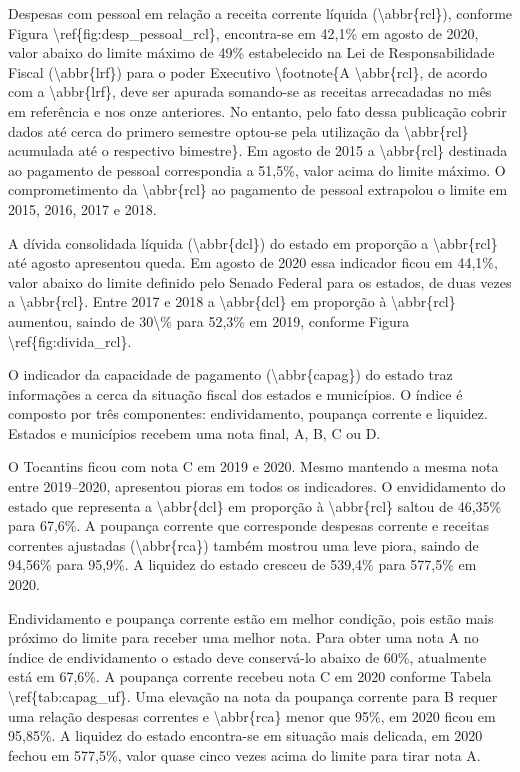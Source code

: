 \documentclass[twocolumn, a4paper, 10pt]{report}
\begin{document}
    Despesas com pessoal em relação a receita corrente líquida
    (\textbackslash abbr\{rcl\}), conforme Figura
    \textbackslash ref\{fig:desp\_pessoal\_rcl\}, encontra-se em 42,1\%
    em agosto de 2020, valor abaixo do limite máximo de 49\%
    estabelecido na Lei de Responsabilidade Fiscal
    (\textbackslash abbr\{lrf\}) para o poder Executivo
    \textbackslash footnote\{A \textbackslash abbr\{rcl\}, de acordo com
    a \textbackslash abbr\{lrf\}, deve ser apurada somando-se as
    receitas arrecadadas no mês em referência e nos onze anteriores. No
    entanto, pelo fato dessa publicação cobrir dados até cerca do
    primero semestre optou-se pela utilização da
    \textbackslash abbr\{rcl\} acumulada até o respectivo bimestre\}. Em
    agosto de 2015 a \textbackslash abbr\{rcl\} destinada ao pagamento
    de pessoal correspondia a 51,5\%, valor acima do limite máximo. O
    comprometimento da \textbackslash abbr\{rcl\} ao pagamento de
    pessoal extrapolou o limite em 2015, 2016, 2017 e 2018.

    A dívida consolidada líquida (\textbackslash abbr\{dcl\}) do estado
    em proporção a \textbackslash abbr\{rcl\} até agosto apresentou
    queda. Em agosto de 2020 essa indicador ficou em 44,1\%, valor
    abaixo do limite definido pelo Senado Federal para os estados, de
    duas vezes a \textbackslash abbr\{rcl\}. Entre 2017 e 2018 a
    \textbackslash abbr\{dcl\} em proporção à \textbackslash abbr\{rcl\}
    aumentou, saindo de 30\textbackslash\% para 52,3\% em 2019, conforme
    Figura \textbackslash ref\{fig:divida\_rcl\}.

    O indicador da capacidade de pagamento
    (\textbackslash abbr\{capag\}) do estado traz informações a cerca da
    situação fiscal dos estados e municípios. O índice é composto por
    três componentes: endividamento, poupança corrente e liquidez.
    Estados e municípios recebem uma nota final, A, B, C ou D.

    O Tocantins ficou com nota C em 2019 e 2020. Mesmo mantendo a mesma
    nota entre 2019--2020, apresentou pioras em todos os indicadores. O
    envididamento do estado que representa a \textbackslash abbr\{dcl\}
    em proporção à \textbackslash abbr\{rcl\} saltou de 46,35\% para
    67,6\%. A poupança corrente que corresponde despesas corrente e
    receitas correntes ajustadas (\textbackslash abbr\{rca\}) também
    mostrou uma leve piora, saindo de 94,56\% para 95,9\%. A liquidez do
    estado cresceu de 539,4\% para 577,5\% em 2020.

    Endividamento e poupança corrente estão em melhor condição, pois
    estão mais próximo do limite para receber uma melhor nota. Para
    obter uma nota A no índice de endividamento o estado deve
    conservá-lo abaixo de 60\%, atualmente está em 67,6\%. A poupança
    corrente recebeu nota C em 2020 conforme Tabela
    \textbackslash ref\{tab:capag\_uf\}. Uma elevação na nota da
    poupança corrente para B requer uma relação despesas correntes e
    \textbackslash abbr\{rca\} menor que 95\%, em 2020 ficou em 95,85\%.
    A liquidez do estado encontra-se em situação mais delicada, em 2020
    fechou em 577,5\%, valor quase cinco vezes acima do limite para
    tirar nota A.
\end{document}
